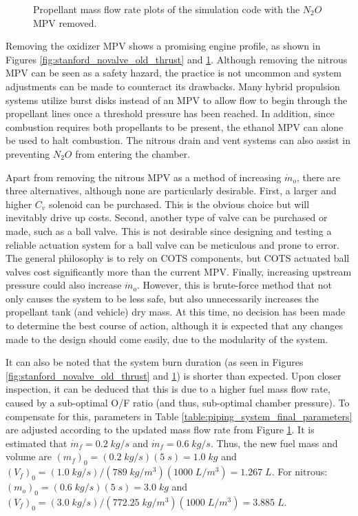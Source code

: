 \documentclass[9pt]{article} %
\numberwithin{equation}{section} %
\begin{document}
\begin{figure}
\begin{minipage}{0.49\textwidth}
        \caption{Propellant mass flow rate plots of the simulation code with the $N_{2}O$ MPV removed.}
        \label{fig:stanford_novalve_old_fuel}
    \end{minipage}
\end{figure} 

Removing the oxidizer MPV shows a promising engine profile, as shown in Figures \ref{fig:stanford_novalve_old_thrust} and \ref{fig:stanford_novalve_old_fuel}. Although removing the nitrous MPV can be seen as a safety hazard, the practice is not uncommon and system adjustments can be made to counteract its drawbacks. Many hybrid propulsion systems utilize burst disks instead of an MPV to allow flow to begin through the propellant lines once a threshold pressure has been reached. In addition, since combustion requires both propellants to be present, the ethanol MPV can alone be used to halt combustion. The nitrous drain and vent systems can also assist in preventing $N_{2}O$ from entering the chamber. 

Apart from removing the nitrous MPV as a method of increasing $\dot{m}_{o}$, there are three alternatives, although none are particularly desirable. First, a larger and higher $C_{v}$ solenoid can be purchased. This is the obvious choice but will inevitably drive up costs. Second, another type of valve can be purchased or made, such as a ball valve. This is not desirable since designing and testing a reliable actuation system for a ball valve can be meticulous and prone to error. The general philosophy is to rely on COTS components, but COTS actuated ball valves cost significantly more than the current MPV. Finally, increasing upstream pressure could also increase $\dot{m}_{o}$. However, this is brute-force method that not only causes the system to be less safe, but also unnecessarily increases the propellant tank (and vehicle) dry mass. At this time, no decision has been made to determine the best course of action, although it is expected that any changes made to the design should come easily, due to the modularity of the system.

It can also be noted that the system burn duration (as seen in Figures \ref{fig:stanford_novalve_old_thrust} and \ref{fig:stanford_novalve_old_fuel}) is shorter than expected. Upon closer inspection, it can be deduced that this is due to a higher fuel mass flow rate, caused by a sub-optimal O/F ratio (and thus, sub-optimal chamber pressure). To compensate for this, parameters in Table \ref{table:piping_system_final_parameters} are adjusted according to the updated mass flow rate from Figure \ref{fig:stanford_novalve_old_fuel}. It is estimated that $\dot{m}_{f} = 0.2 \; kg/s$ and $\dot{m}_{f} = 0.6 \; kg/s$. Thus, the new fuel mass and volume are $(m_{f})_{0} = (0.2 \; kg/s)(5 \; s) = 1.0 \; kg $ and $(V_{f})_{0} = (1.0 \; kg/s)/(789 \; kg/m^{3})(1000 \; L/m^{3}) = 1.267 \; L$. For nitrous: $(m_{o})_{0} = (0.6 \; kg/s)(5 \; s) = 3.0 \; kg $ and $(V_{f})_{0} = (3.0 \; kg/s)/(772.25 \; kg/m^{3})(1000 \; L/m^{3}) = 3.885 \; L$.
\end{document}
